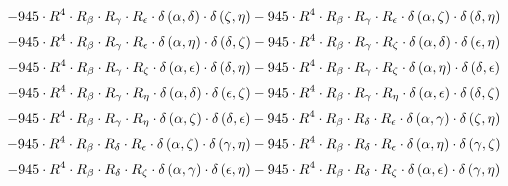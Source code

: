 \begin{subequations}
\begin{gather}
 \\[0.2em] \notag 		 - 945 \cdot R^{4} \cdot R_{\beta{}} \cdot R_{\gamma{}} \cdot R_{\epsilon{}} \cdot \delta{}\left(\alpha{}, \delta{}\right) \cdot \delta{}\left(\zeta{}, \eta{}\right)- 945 \cdot R^{4} \cdot R_{\beta{}} \cdot R_{\gamma{}} \cdot R_{\epsilon{}} \cdot \delta{}\left(\alpha{}, \zeta{}\right) \cdot \delta{}\left(\delta{}, \eta{}\right) 
 \\[0.2em] \notag 		 - 945 \cdot R^{4} \cdot R_{\beta{}} \cdot R_{\gamma{}} \cdot R_{\epsilon{}} \cdot \delta{}\left(\alpha{}, \eta{}\right) \cdot \delta{}\left(\delta{}, \zeta{}\right)- 945 \cdot R^{4} \cdot R_{\beta{}} \cdot R_{\gamma{}} \cdot R_{\zeta{}} \cdot \delta{}\left(\alpha{}, \delta{}\right) \cdot \delta{}\left(\epsilon{}, \eta{}\right) 
 \\[0.2em] \notag 		 - 945 \cdot R^{4} \cdot R_{\beta{}} \cdot R_{\gamma{}} \cdot R_{\zeta{}} \cdot \delta{}\left(\alpha{}, \epsilon{}\right) \cdot \delta{}\left(\delta{}, \eta{}\right)- 945 \cdot R^{4} \cdot R_{\beta{}} \cdot R_{\gamma{}} \cdot R_{\zeta{}} \cdot \delta{}\left(\alpha{}, \eta{}\right) \cdot \delta{}\left(\delta{}, \epsilon{}\right) 
 \\[0.2em] \notag 		 - 945 \cdot R^{4} \cdot R_{\beta{}} \cdot R_{\gamma{}} \cdot R_{\eta{}} \cdot \delta{}\left(\alpha{}, \delta{}\right) \cdot \delta{}\left(\epsilon{}, \zeta{}\right)- 945 \cdot R^{4} \cdot R_{\beta{}} \cdot R_{\gamma{}} \cdot R_{\eta{}} \cdot \delta{}\left(\alpha{}, \epsilon{}\right) \cdot \delta{}\left(\delta{}, \zeta{}\right) 
 \\[0.2em] \notag 		 - 945 \cdot R^{4} \cdot R_{\beta{}} \cdot R_{\gamma{}} \cdot R_{\eta{}} \cdot \delta{}\left(\alpha{}, \zeta{}\right) \cdot \delta{}\left(\delta{}, \epsilon{}\right)- 945 \cdot R^{4} \cdot R_{\beta{}} \cdot R_{\delta{}} \cdot R_{\epsilon{}} \cdot \delta{}\left(\alpha{}, \gamma{}\right) \cdot \delta{}\left(\zeta{}, \eta{}\right) 
 \\[0.2em] \notag 		 - 945 \cdot R^{4} \cdot R_{\beta{}} \cdot R_{\delta{}} \cdot R_{\epsilon{}} \cdot \delta{}\left(\alpha{}, \zeta{}\right) \cdot \delta{}\left(\gamma{}, \eta{}\right)- 945 \cdot R^{4} \cdot R_{\beta{}} \cdot R_{\delta{}} \cdot R_{\epsilon{}} \cdot \delta{}\left(\alpha{}, \eta{}\right) \cdot \delta{}\left(\gamma{}, \zeta{}\right) 
 \\[0.2em] \notag 		 - 945 \cdot R^{4} \cdot R_{\beta{}} \cdot R_{\delta{}} \cdot R_{\zeta{}} \cdot \delta{}\left(\alpha{}, \gamma{}\right) \cdot \delta{}\left(\epsilon{}, \eta{}\right)- 945 \cdot R^{4} \cdot R_{\beta{}} \cdot R_{\delta{}} \cdot R_{\zeta{}} \cdot \delta{}\left(\alpha{}, \epsilon{}\right) \cdot \delta{}\left(\gamma{}, \eta{}\right) 

\end{gather}
\end{subequations}
